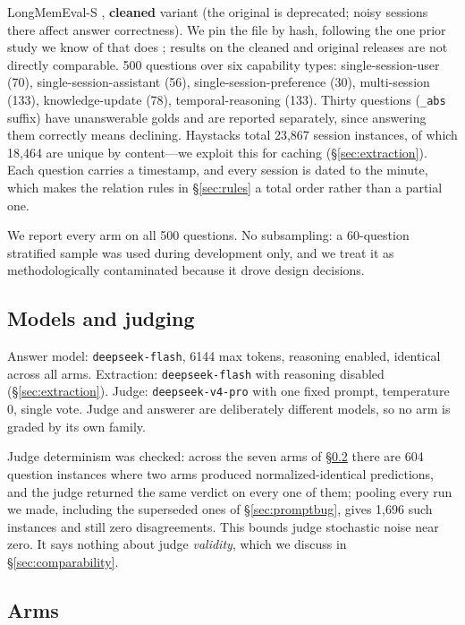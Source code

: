 \documentclass[11pt]{article}
\begin{document}
LongMemEval-S \citep{longmemeval}, \textbf{cleaned} variant (the original is deprecated; noisy sessions there affect answer correctness). We pin the file by hash, following the one prior study we know of that does \citep{evictiondestroys}; results on the cleaned and original releases are not directly comparable. 500 questions over six capability types: single-session-user (70), single-session-assistant (56), single-session-preference (30), multi-session (133), knowledge-update (78), temporal-reasoning (133). Thirty questions (\texttt{\_abs} suffix) have unanswerable golds and are reported separately, since answering them correctly means declining. Haystacks total 23{,}867 session instances, of which 18{,}464 are unique by content---we exploit this for caching (\S\ref{sec:extraction}). Each question carries a timestamp, and every session is dated to the minute, which makes the relation rules in \S\ref{sec:rules} a total order rather than a partial one.

We report every arm on all 500 questions. No subsampling: a 60-question stratified sample was used during development only, and we treat it as methodologically contaminated because it drove design decisions.

\subsection{Models and judging}

Answer model: \texttt{deepseek-flash}, 6144 max tokens, reasoning enabled, identical across all arms. Extraction: \texttt{deepseek-flash} with reasoning disabled (\S\ref{sec:extraction}). Judge: \texttt{deepseek-v4-pro} with one fixed prompt, temperature 0, single vote. Judge and answerer are deliberately different models, so no arm is graded by its own family.

Judge determinism was checked: across the seven arms of \S\ref{sec:arms} there are 604 question instances where two arms produced normalized-identical predictions, and the judge returned the same verdict on every one of them; pooling every run we made, including the superseded ones of \S\ref{sec:promptbug}, gives 1{,}696 such instances and still zero disagreements. This bounds judge stochastic noise near zero. It says nothing about judge \emph{validity}, which we discuss in \S\ref{sec:comparability}.

\subsection{Arms}
\label{sec:arms}
\end{document}
